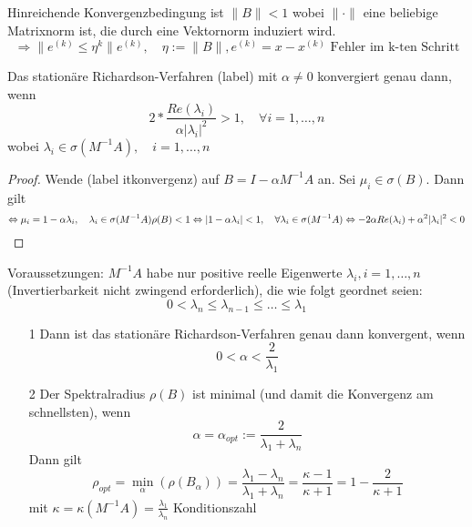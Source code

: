 Hinreichende Konvergenzbedingung ist $\|B\| <1$ wobei $\|\cdot \|$ eine beliebige Matrixnorm ist, die durch eine Vektornorm induziert wird.
\begin{equation*}
  \Rightarrow \|e^{(k)} \leq \eta^k \|e^{(k)}, \quad \eta := \|B\|, e^{(k)} = x-x^{(k)} \text{ Fehler im k-ten Schritt}
\end{equation*}

\begin{satz}
  Das stationäre Richardson-Verfahren (label) mit $\alpha \neq 0$ konvergiert genau dann, wenn 
  \begin{equation}
    2* \frac{Re(\lambda_i)}{\alpha|\lambda_i|^2} > 1, \quad \forall i=1,\dots, n
    \label{}
  \end{equation}
  wobei $\lambda_i \in \sigma(M^{-1}A), \quad i=1,\dots, n$
\end{satz}

\begin{proof}
  Wende (label itkonvergenz) auf $B=I-\alpha M^{-1}A$ an. Sei $\mu_i \in \sigma(B)$. Dann gilt
  \begin{equation*}
    \Leftrightarrow \mu_i = 1-\alpha \lambda_i, \quad \lambda_i \in \sigma(M^{-1}A)\\
    \rho(B) < 1 \Leftrightarrow |1-\alpha\lambda_i| <1, \quad \forall \lambda_i \in \sigma(M^{-1}A)
    \Leftrightarrow -2 \alpha Re(\lambda_i) + \alpha^2 |\lambda_i|^2 <0
  \end{equation*}
\end{proof}

\begin{satz}
  Voraussetzungen: $M^{-1}A$ habe nur positive reelle Eigenwerte $\lambda_i, i=1,\dots, n$ (Invertierbarkeit nicht zwingend erforderlich), die wie folgt geordnet seien:
  \begin{equation*}
    0< \lambda_n \leq \lambda_{n-1} \leq \dots \leq \lambda_1
  \end{equation*}
  \begin{itemize}
    \item[1]  Dann ist das stationäre Richardson-Verfahren genau dann konvergent, wenn 
             \begin{equation*}
                0 < \alpha < \frac{2}{\lambda_1}
              \end{equation*}
    \item[2] Der Spektralradius $\rho(B)$ ist minimal (und damit die Konvergenz am schnellsten), wenn 
      \begin{equation*}
        \alpha = \alpha_{opt} := \frac{2}{\lambda_1+\lambda_n}
      \end{equation*}
      Dann gilt
      \begin{equation*}
        \rho_{opt} = \min_{\alpha} \left( \rho(B_\alpha) \right) = \frac{\lambda_1-\lambda_n}{\lambda_1+\lambda_n} = \frac{\kappa - 1}{\kappa+1}= 1 - \frac{2}{\kappa+1}
      \end{equation*}
      mit $\kappa = \kappa(M^{-1}A) = \frac{\lambda_1}{\lambda_n}$ Konditionszahl
    

  \end{itemize}
 \end{satz}

